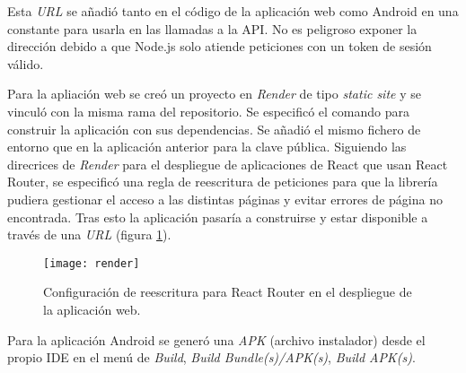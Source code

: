 Esta \textit{URL} se añadió tanto en el código de la aplicación web como Android en una constante para usarla en las llamadas a la API. No es peligroso exponer la dirección debido a que Node.js solo atiende peticiones con un token de sesión válido.

Para la apliación web se creó un proyecto en \textit{Render} de tipo \textit{static site} y se vinculó con la misma rama del repositorio. Se especificó el comando  para construir la aplicación con sus dependencias. Se añadió el mismo fichero de entorno que en la aplicación anterior para la clave pública. Siguiendo las direcrices de \textit{Render} para el despliegue de aplicaciones de React que usan React Router, se especificó una regla de reescritura de peticiones para que la librería pudiera gestionar el acceso a las distintas páginas y evitar errores de página no encontrada. Tras esto la aplicación pasaría a construirse y estar disponible a través de una \textit{URL} (figura \ref{fig:render}).

\begin{figure}[h]
    \centering
    \texttt{[image: render]}
    \caption[Reescritura de peticiones para React Router]{Configuración de reescritura para React Router en el despliegue de la aplicación web.}
    \label{fig:render}
\end{figure}

Para la aplicación Android se generó una \textit{APK} (archivo instalador) desde el propio IDE en el menú de \textit{Build}, \textit{Build Bundle(s)/APK(s)}, \textit{Build APK(s)}.
